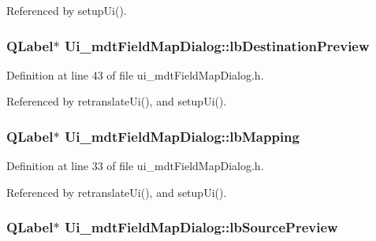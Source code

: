 Referenced by setup\-Ui().

\hypertarget{class_ui__mdt_field_map_dialog_aba3f44c01ed87ecf11f384c29d20bf65}{
\subsubsection[{lb\-Destination\-Preview}]{\setlength{\rightskip}{0pt plus 5cm}Q\-Label$\ast$ Ui\-\_\-mdt\-Field\-Map\-Dialog\-::lb\-Destination\-Preview}}\label{class_ui__mdt_field_map_dialog_aba3f44c01ed87ecf11f384c29d20bf65}


Definition at line 43 of file ui\-\_\-mdt\-Field\-Map\-Dialog.\-h.



Referenced by retranslate\-Ui(), and setup\-Ui().

\hypertarget{class_ui__mdt_field_map_dialog_aa508b425116eee11931533fb4ec7dace}{
\subsubsection[{lb\-Mapping}]{\setlength{\rightskip}{0pt plus 5cm}Q\-Label$\ast$ Ui\-\_\-mdt\-Field\-Map\-Dialog\-::lb\-Mapping}}\label{class_ui__mdt_field_map_dialog_aa508b425116eee11931533fb4ec7dace}


Definition at line 33 of file ui\-\_\-mdt\-Field\-Map\-Dialog.\-h.



Referenced by retranslate\-Ui(), and setup\-Ui().

\hypertarget{class_ui__mdt_field_map_dialog_a3248ea0ebd503efd35f27776d92fc78a}{
\subsubsection[{lb\-Source\-Preview}]{\setlength{\rightskip}{0pt plus 5cm}Q\-Label$\ast$ Ui\-\_\-mdt\-Field\-Map\-Dialog\-::lb\-Source\-Preview}}\label{class_ui__mdt_field_map_dialog_a3248ea0ebd503efd35f27776d92fc78a}


